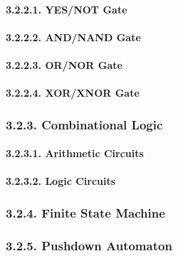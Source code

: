 \documentclass[
]{article}
\begin{document}
\hypertarget{yesnot-gate}{%
\paragraph{3.2.2.1. YES/NOT Gate}\label{yesnot-gate}}

\hypertarget{andnand-gate}{%
\paragraph{3.2.2.2. AND/NAND Gate}\label{andnand-gate}}

\hypertarget{ornor-gate}{%
\paragraph{3.2.2.3. OR/NOR Gate}\label{ornor-gate}}

\hypertarget{xorxnor-gate}{%
\paragraph{3.2.2.4. XOR/XNOR Gate}\label{xorxnor-gate}}

\hypertarget{combinational-logic}{%
\subsubsection{3.2.3. Combinational Logic}\label{combinational-logic}}

\hypertarget{arithmetic-circuits}{%
\paragraph{3.2.3.1. Arithmetic Circuits}\label{arithmetic-circuits}}

\hypertarget{logic-circuits}{%
\paragraph{3.2.3.2. Logic Circuits}\label{logic-circuits}}

\hypertarget{finite-state-machine}{%
\subsubsection{3.2.4. Finite State Machine}\label{finite-state-machine}}

\hypertarget{pushdown-automaton}{%
\subsubsection{3.2.5. Pushdown Automaton}\label{pushdown-automaton}}
\end{document}
